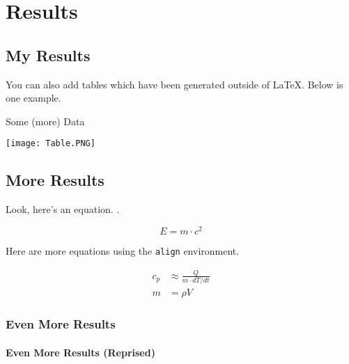 \chapter{Results}
\label{ch:Results}

\section{My Results}

You can also add tables which have been generated outside of \LaTeX. Below is one example.

\begin{table}[h]
\centering
\caption{Some (more) Data}
\label{tab:more data}
\texttt{[image: Table.PNG]}
\end{table}

\section{More Results}

Look, here's an equation. \cite{Bill2220}.

\begin{equation}
    E = m \cdot c^2
\end{equation}

Here are more equations using the \texttt{align} environment.

\begin{align}
    c_p &\approx \frac{Q}{m \cdot dT/dt} \\
    m &= \rho V
\end{align}

\subsection{Even More Results}

\lipsum[1]

\subsubsection{Even More Results (Reprised)}

